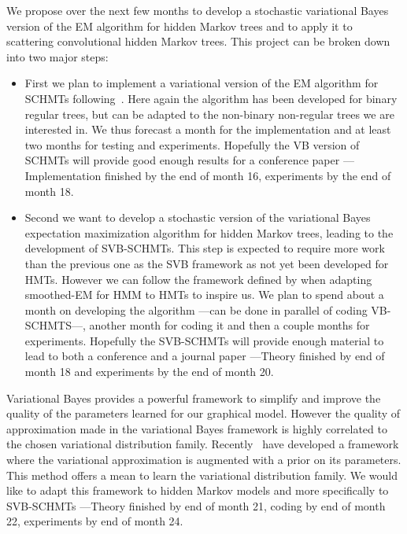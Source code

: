 \documentclass[a4paper,11pt]{report}
\begin{document}
			We propose over the next few months to develop a stochastic variational Bayes version of the EM algorithm for hidden Markov trees and to apply it to scattering convolutional hidden Markov trees. This project can be broken down into two major steps:\\

			\begin{itemize}
				\item First we plan to implement a variational version of the EM algorithm for SCHMTs following~\citep{olariu2009modified}. Here again the algorithm has been developed for binary regular trees, but can be adapted to the non-binary non-regular trees we are interested in. We thus forecast a month for the implementation and at least two months for testing and experiments. Hopefully the VB version of SCHMTs will provide good enough results for a conference paper ---Implementation finished by the end of month 16, experiments by the end of month 18.\\
				
				\item Second we want to develop a stochastic version of the variational Bayes expectation maximization algorithm for hidden Markov trees, leading to the development of SVB-SCHMTs.  This step is expected to require more work than the previous one as the SVB framework as not yet been developed for HMTs. However we can follow the framework defined by \citet{durand2004computational} when adapting ~\citet{devijver1985baum} smoothed-EM for HMM to HMTs to inspire us. We plan to spend about a month on developing the algorithm ---can be done in parallel of coding VB-SCHMTS---, another month for coding it and then a couple months for experiments. Hopefully the SVB-SCHMTs will provide enough material to lead to both a conference and a journal paper ---Theory finished by end of month 18 and experiments by the end of month 20.\\
			\end{itemize}

			Variational Bayes provides a powerful framework to simplify and improve the quality of the parameters learned for our graphical model. However the quality of approximation made in the variational Bayes framework is highly correlated to the chosen variational distribution family. Recently~\citet{ranganath2015hierarchical} have developed a framework where the variational approximation is augmented with a prior on its parameters. This method offers a mean to learn the variational distribution family. We would like to adapt this framework to hidden Markov models and more specifically to SVB-SCHMTs ---Theory finished by end of month 21, coding by end of month 22, experiments by end of month 24.
			
\end{document}
